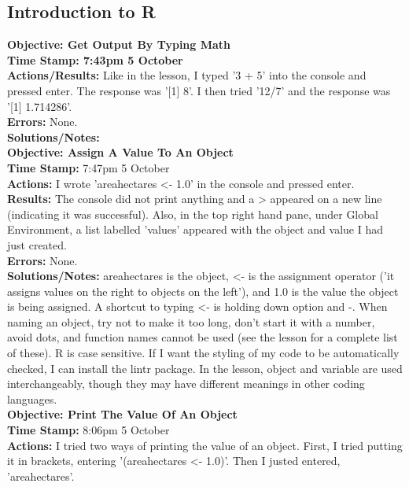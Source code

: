 \documentclass{article}
\begin{document}
\begin{FlushLeft}
\subsection{Introduction to R}
\textbf{Objective: Get Output By Typing Math}\\ 
\textbf{Time Stamp: 7:43pm 5 October} \\
\textbf{Actions/Results:} Like in the lesson, I typed '3 + 5' into the console and pressed enter. The response was '[1] 8'. I then tried '12/7' and the response was '[1] 1.714286'.\\
\textbf{Errors:} None.\\
\textbf{Solutions/Notes:}\\
\vspace{5mm}
\textbf{Objective: Assign A Value To An Object}\\ 
\textbf{Time Stamp:} 7:47pm 5 October\\
\textbf{Actions:} I wrote 'area\textunderscore hectares \textless - 1.0' in the console and pressed enter. \\
\textbf{Results:} The console did not print anything and a \textgreater{} appeared on a new line (indicating it was successful). Also, in the top right hand pane, under Global Environment, a list labelled 'values' appeared with the object and value I had just created. \\
\textbf{Errors:} None.\\
\textbf{Solutions/Notes:} area\textunderscore hectares is the object, \textless - is the assignment operator ('it assigns values on the right to objects on the left'), and 1.0 is the value the object is being assigned. A shortcut to typing \textless - is holding down option and -. When naming an object, try not to make it too long, don't start it with a number, avoid dots, and function names cannot be used (see the lesson for a complete list of these). R is case sensitive. If I want the styling of my code to be automatically checked, I can install the lintr package. In the lesson, object and variable are used interchangeably, though they may have different meanings in other coding languages.\\
\vspace{5mm}
\textbf{Objective: Print The Value Of An Object}\\ 
\textbf{Time Stamp:} 8:06pm 5 October\\
\textbf{Actions:} I tried two ways of printing the value of an object. First, I tried putting it in brackets, entering '(area\textunderscore hectares \textless - 1.0)'. Then I justed entered, 'area\textunderscore hectares'.\\

\end{FlushLeft}
\end{document}
